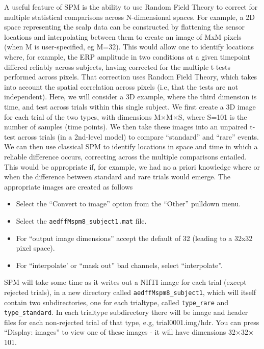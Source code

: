 A useful feature of SPM is the ability to use Random Field Theory to correct for multiple statistical comparisons across N-dimensional spaces. For example, a 2D space representing the scalp data can be constructed by flattening the sensor locations and interpolating between them to create an image of MxM pixels (when M is user-specified, eg M=32). This would allow one to identify locations where, for example, the ERP amplitude in two conditions at a given timepoint differed reliably across subjects, having corrected for the multiple t-tests performed across pixels. That correction uses Random Field Theory, which takes into account the spatial correlation across pixels (i.e, that the tests are not independent). 
Here, we will consider a 3D example, where the third dimension is time, and test across trials within this single subject. We first create a 3D image for each trial of the two types, with dimensions M$\times$M$\times$S, where S=101 is the number of samples (time points). We then take these images into an unpaired t-test across trials (in a 2nd-level model) to compare ``standard'' and ``rare'' events. We can then use classical SPM to identify locations in space and time in which a reliable difference occurs, correcting across the multiple comparisons entailed. This would be appropriate if, for example, we had no a priori knowledge where or when the difference between standard and rare trials would emerge. The appropriate images are created as follows
\begin{itemize}
\item{Select the ``Convert to image'' option from the ``Other'' pulldown menu.}
\item{Select the \texttt{aedffMspm8\_subject1.mat} file.}
\item{For ``output image dimensions'' accept the default of 32 (leading to a 32x32 pixel space).}
\item{For ``interpolate' or ``mask out'' bad channels, select ``interpolate''.}
\end{itemize}
SPM will take some time as it writes out a NIfTI image for each trial (except rejected trials), in a new directory called \texttt{aedffMspm8\_subject1}, which will itself contain two subdirectories, one for each trialtype, called \texttt{type\_rare} and \texttt{type\_standard}. In each trialtype subdirectory there will be image and header files for each non-rejected trial of that type, e.g, trial0001.img/hdr. You can press ``Display: images'' to view one of these images - it will have dimensions 32$\times$32$\times$101.

